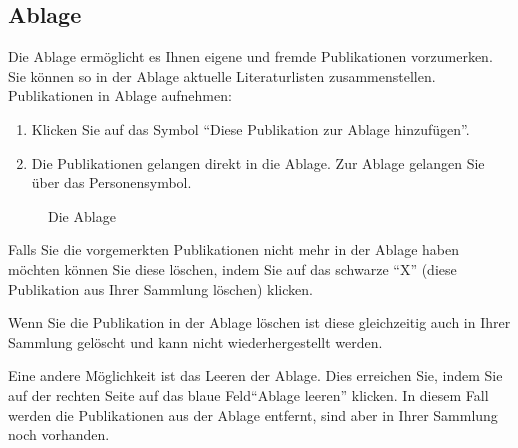 \subsection{Ablage}
Die Ablage ermöglicht es Ihnen eigene und fremde Publikationen vorzumerken. Sie können so in der Ablage aktuelle Literaturlisten zusammenstellen.
\newline
Publikationen in Ablage aufnehmen: %
\begin{enumerate}
    \item Klicken Sie auf das Symbol \enquote{Diese Publikation zur Ablage hinzufügen}.
    \item Die Publikationen gelangen direkt in die Ablage. Zur Ablage gelangen Sie über das Personensymbol.
\end{enumerate}
\begin{figure}[h!]
 \centering
 \caption{Die Ablage}
 \label{figure3}
\end{figure} 
Falls Sie die vorgemerkten Publikationen nicht mehr in der Ablage haben möchten können Sie diese löschen, indem Sie auf das schwarze \enquote{X} (diese Publikation aus Ihrer Sammlung löschen) klicken.\newline
\begin{mdframed}[style=mdfexample1,frametitle={ACHTUNG},backgroundcolor=gray!40]Wenn Sie die Publikation in der Ablage löschen ist diese gleichzeitig auch in Ihrer Sammlung gelöscht und kann nicht wiederhergestellt werden.
\end{mdframed}

Eine andere Möglichkeit ist das Leeren der Ablage. Dies erreichen Sie, indem Sie auf der rechten Seite auf das blaue Feld\enquote{Ablage leeren} klicken. In diesem Fall werden die Publikationen aus der Ablage entfernt, sind aber in Ihrer Sammlung noch vorhanden.

